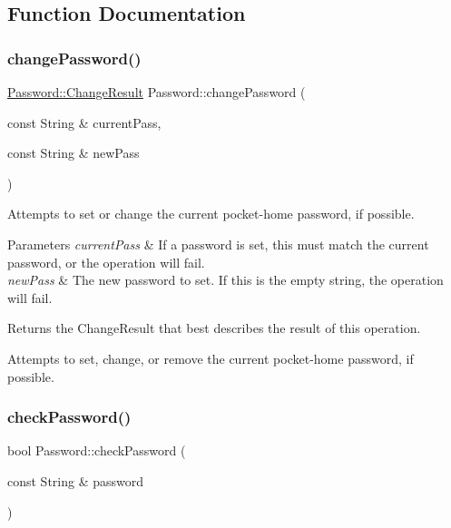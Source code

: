 \subsection{Function Documentation}
\mbox{\label{namespacePassword_aeca8cfb7c7b403e605deade48483acc8}} 
\subsubsection{\texorpdfstring{change\+Password()}{changePassword()}}
{\footnotesize\ttfamily \mbox{\hyperlink{namespacePassword_a24f6e5d7a04a280a0ffe45daa70f0bf3}{Password\+::\+Change\+Result}} Password\+::change\+Password (\begin{DoxyParamCaption}\item[{const String \&}]{current\+Pass,  }\item[{const String \&}]{new\+Pass }\end{DoxyParamCaption})}

Attempts to set or change the current pocket-\/home password, if possible.


\begin{DoxyParams}{Parameters}
{\em current\+Pass} & If a password is set, this must match the current password, or the operation will fail.\\
\hline
{\em new\+Pass} & The new password to set. If this is the empty string, the operation will fail.\\
\hline
\end{DoxyParams}
\begin{DoxyReturn}{Returns}
the Change\+Result that best describes the result of this operation.
\end{DoxyReturn}
Attempts to set, change, or remove the current pocket-\/home password, if possible. \mbox{\label{namespacePassword_a2af5e07ad6fd20b5cce68816918841e0}} 
\subsubsection{\texorpdfstring{check\+Password()}{checkPassword()}}
{\footnotesize\ttfamily bool Password\+::check\+Password (\begin{DoxyParamCaption}\item[{const String \&}]{password }\end{DoxyParamCaption})}

